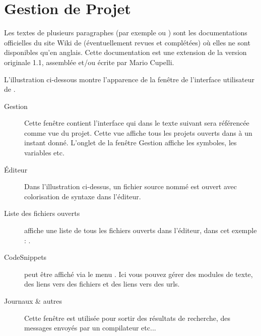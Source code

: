 \chapter{Gestion de Projet \codeblocks}

Les textes de plusieurs paragraphes (par exemple  ou ) sont les documentations officielles du site Wiki de \codeblocks (éventuellement revues et complétées) où elles ne sont disponibles qu'en anglais.
Cette documentation est une extension de la version originale 1.1, assemblée et/ou écrite par Mario Cupelli.


L'illustration ci-dessous montre l'apparence de la fenêtre de l'interface utilisateur de \codeblocks.


\begin{description}
\item[Gestion] Cette fenêtre contient l'interface  qui dans le texte suivant sera référencée comme vue du projet. Cette vue affiche tous les projets ouverts dans \codeblocks à un instant donné. L'onglet  de la fenêtre Gestion affiche les symboles, les variables etc.
\item[Éditeur] Dans l'illustration ci-dessus, un fichier source nommé  est ouvert avec colorisation de syntaxe dans l'éditeur.
\item[Liste des fichiers ouverts] affiche une liste de tous les fichiers ouverts dans l'éditeur, dans cet exemple : .
\item[CodeSnippets] peut être affiché via le menu . Ici vous pouvez gérer des modules de texte, des liens vers des fichiers et des liens vers des urls.
\item[Journaux \& autres] Cette fenêtre est utilisée pour sortir des résultats de recherche, des messages envoyés par un compilateur etc...
\end{description}

